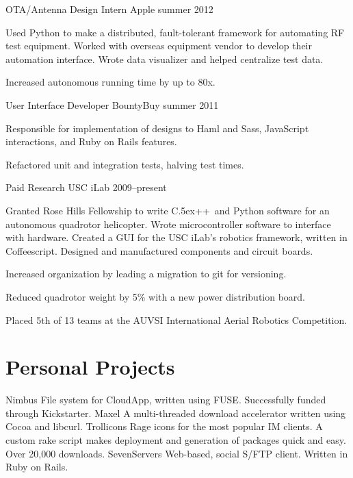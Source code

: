\documentclass[print]{friggeri-cv}
\newenvironment{itemize*}%
  {\begin{itemize}%
    \setlength{\itemsep}{0pt}%
    \setlength{\parskip}{0pt}}%
  {\end{itemize}}
\def\Cplusplus{{\rm C\raise.5ex\hbox{\small ++}}~}
\begin{document}
\workexperience
  {OTA/Antenna Design Intern}
  {Apple}
  {summer 2012}
  {
  Used Python to make a distributed, fault-tolerant framework for automating RF test equipment. Worked with overseas equipment vendor to develop their automation interface. Wrote data visualizer and helped centralize test data.
  \begin{itemize*}
    \item Increased autonomous running time by up to 80x.
  \end{itemize*}
  }

\workexperience
  {User Interface Developer}
  {BountyBuy}
  {summer 2011}
  {
  Responsible for implementation of designs to Haml and Sass, JavaScript interactions, and Ruby on Rails features.
  \begin{itemize*}
    \item Refactored unit and integration tests, halving test times.
  \end{itemize*}
  }

\workexperience
  {Paid Research}
  {USC iLab}
  {2009--present}
  {
  Granted Rose Hills Fellowship to write \Cplusplus and Python software for an autonomous quadrotor helicopter. Wrote microcontroller software to interface with hardware. Created a GUI for the USC iLab's robotics framework, written in Coffeescript. Designed and manufactured components and circuit boards.
  \begin{itemize*}
    \item Increased organization by leading a migration to git for versioning.
    \item Reduced quadrotor weight by 5\% with a new power distribution board.
    \item Placed 5th of 13 teams at the AUVSI International Aerial Robotics Competition.
  \end{itemize*}
  }

\section{Personal Projects}

\begin{entrylist}
  \project
    {Nimbus}
    {File system for CloudApp, written using FUSE. Successfully funded through Kickstarter.}
  \project
    {Maxel}
    {A multi-threaded download accelerator written using Cocoa and libcurl.}
  \project
    {Trollicons}
    {Rage icons for the most popular IM clients. A custom rake script makes deployment and generation of packages quick and easy. Over 20,000 downloads.}
  \project
    {SevenServers}
    {Web-based, social S/FTP client. Written in Ruby on Rails.}
\end{entrylist}

\nopagebreak
\end{document}
